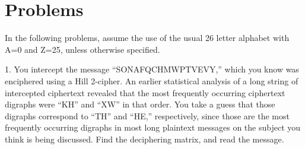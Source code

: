 \section{Problems}
In the following problems, assume the use of the usual 26 letter alphabet with A=0 and Z=25, unless otherwise specified.


1. You intercept the message “SONAFQCHMWPTVEVY,” which you know was enciphered using a Hill 2-cipher. 
An earlier statistical analysis of a long string of intercepted ciphertext revealed that the most frequently occurring ciphertext digraphs were “KH” and “XW” in that order. 
You take a guess that those digraphs correspond to “TH” and “HE,” respectively, since those are the most frequently occurring digraphs in most long plaintext messages on the subject you think is being discussed.
Find the deciphering matrix, and read the message.
